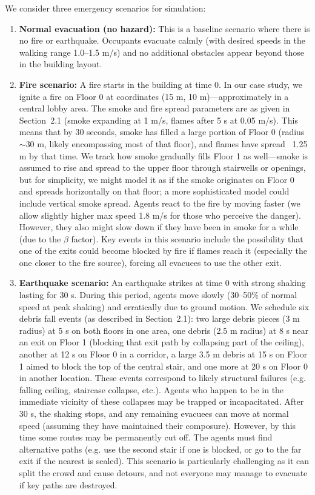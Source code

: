 \documentclass[11pt,a4paper]{article}
\begin{document}
We consider three emergency scenarios for simulation:
\begin{enumerate}
    \item \textbf{Normal evacuation (no hazard):} This is a baseline scenario where there is no fire or earthquake. Occupants evacuate calmly (with desired speeds in the walking range 1.0--1.5 m/s) and no additional obstacles appear beyond those in the building layout.
    \item \textbf{Fire scenario:} A fire starts in the building at time $0$. In our case study, we ignite a fire on Floor 0 at coordinates (15 m, 10 m)---approximately in a central lobby area. The smoke and fire spread parameters are as given in Section~2.1 (smoke expanding at 1 m/s, flames after 5 s at 0.05 m/s). This means that by 30 seconds, smoke has filled a large portion of Floor 0 (radius $\sim 30$ m, likely encompassing most of that floor), and flames have spread ~1.25 m by that time. We track how smoke gradually fills Floor 1 as well---smoke is assumed to rise and spread to the upper floor through stairwells or openings, but for simplicity, we might model it as if the smoke originates on Floor 0 and spreads horizontally on that floor; a more sophisticated model could include vertical smoke spread. Agents react to the fire by moving faster (we allow slightly higher max speed 1.8 m/s for those who perceive the danger). However, they also might slow down if they have been in smoke for a while (due to the $\beta$ factor). Key events in this scenario include the possibility that one of the exits could become blocked by fire if flames reach it (especially the one closer to the fire source), forcing all evacuees to use the other exit.
    \item \textbf{Earthquake scenario:} An earthquake strikes at time $0$ with strong shaking lasting for 30 s. During this period, agents move slowly (30--50\% of normal speed at peak shaking) and erratically due to ground motion. We schedule six debris fall events (as described in Section~2.1): two large debris pieces (3 m radius) at 5 s on both floors in one area, one debris (2.5 m radius) at 8 s near an exit on Floor 1 (blocking that exit path by collapsing part of the ceiling), another at 12 s on Floor 0 in a corridor, a large 3.5 m debris at 15 s on Floor 1 aimed to block the top of the central stair, and one more at 20 s on Floor 0 in another location. These events correspond to likely structural failures (e.g. falling ceiling, staircase collapse, etc.). Agents who happen to be in the immediate vicinity of these collapses may be trapped or incapacitated. After 30 s, the shaking stops, and any remaining evacuees can move at normal speed (assuming they have maintained their composure). However, by this time some routes may be permanently cut off. The agents must find alternative paths (e.g. use the second stair if one is blocked, or go to the far exit if the nearest is sealed). This scenario is particularly challenging as it can split the crowd and cause detours, and not everyone may manage to evacuate if key paths are destroyed.
\end{enumerate}
\end{document}
